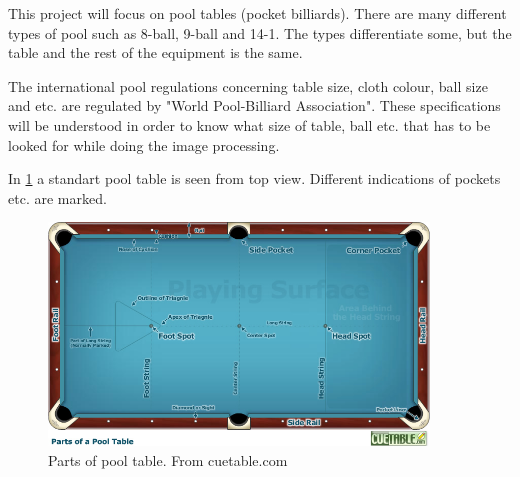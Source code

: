 This project will focus on pool tables (pocket billiards). There are many different types of pool such as 8-ball, 9-ball and 14-1. The types differentiate some, but the table and the rest of the equipment is the same. 

 The international pool regulations concerning table size, cloth colour, ball size and etc. are regulated by "World Pool-Billiard Association". These specifications will be understood in order to know what size of table, ball etc. that has to be looked for while doing the image processing.


In \ref{fig:partspool} a standart pool table is seen from top view. Different indications of pockets etc. are marked.

\begin{figure}[H]
\begin{center}
\leavevmode
\includegraphics[width=0.9\textwidth]{images/pooltablespecs.jpg}
\end{center}
\caption{Parts of pool table. From cuetable.com}
\label{fig:partspool}
\end{figure}

